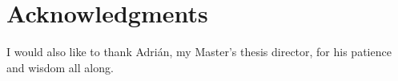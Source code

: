 
\chapter*{Acknowledgments}


I would also like to thank Adrián, my Master's thesis director, for his patience and wisdom all along.














